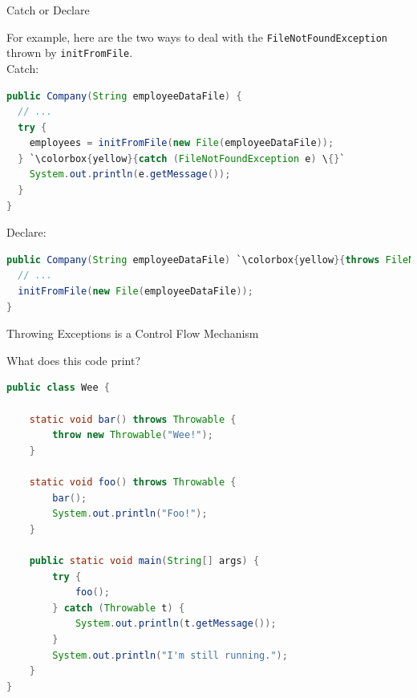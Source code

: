 \documentclass{beamer}
\begin{document}
\begin{frame}[fragile]{Catch or Declare}


For example, here are the two ways to deal with the {\tt FileNotFoundException} thrown by {\tt initFromFile}.\\
\vspace{.1in}
Catch:
\vspace{-.05in}
\begin{lstlisting}[language=Java,escapechar=`]
public Company(String employeeDataFile) {
  // ...
  try {
    employees = initFromFile(new File(employeeDataFile));
  } `\colorbox{yellow}{catch (FileNotFoundException e) \{}`
    System.out.println(e.getMessage());
  }
}
\end{lstlisting}
Declare:
\vspace{-.05in}
\begin{lstlisting}[language=Java,escapechar=`]
public Company(String employeeDataFile) `\colorbox{yellow}{throws FileNotFoundException \{}`
  // ...
  initFromFile(new File(employeeDataFile));
}
\end{lstlisting}

\end{frame}

\begin{frame}[fragile]{Throwing Exceptions is a Control Flow Mechanism}


What does this code print?
\begin{lstlisting}[language=Java]
public class Wee {

    static void bar() throws Throwable {
        throw new Throwable("Wee!");
    }

    static void foo() throws Throwable {
        bar();
        System.out.println("Foo!");
    }

    public static void main(String[] args) {
        try {
            foo();
        } catch (Throwable t) {
            System.out.println(t.getMessage());
        }
        System.out.println("I'm still running.");
    }
}
\end{lstlisting}

\end{frame}
\end{document}
